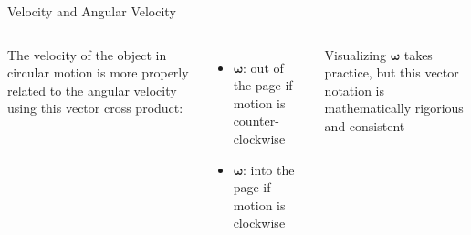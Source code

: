 \documentclass[12pt,compress,aspectratio=169]{beamer}
\newcommand{\eq}[2]{\vspace{#1}{\Large\begin{displaymath}#2\end{displaymath}}}
\begin{document}
\begin{frame}{Velocity and Angular Velocity}
  \begin{columns}

    The velocity of the object in circular motion is more properly related to
    the angular velocity using this vector cross product:

    \eq{-.25in}{
      \bm{v}=\bm{\omega}\times\bm{r}
    }

    \begin{itemize}
    \item\vspace{-.2in}$\bm{\omega}$: out of the page if motion is
      counter-clockwise
    \item $\bm{\omega}$: into the page if motion is clockwise
    \end{itemize}
    Visualizing $\bm{\omega}$ takes practice, but this vector notation is
    mathematically rigorious and consistent
  \end{columns}
\end{frame}
\end{document}
